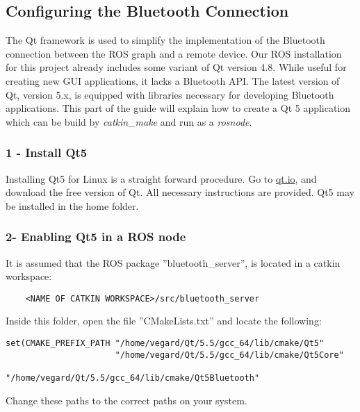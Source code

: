 \subsection{Configuring the Bluetooth Connection}

The Qt framework is used to simplify the implementation of the Bluetooth connection between the \ac{ROS} graph and a remote device. Our \ac{ROS} installation for this project already includes some variant of Qt version 4.8. While useful for creating new \ac{GUI} applications, it lacks a Bluetooth API. The latest version of Qt, version 5.x, is equipped with libraries necessary for developing Bluetooth applications. This part of the guide will explain how to create a Qt 5 application which can be build by \textit{catkin\_make} and run as a \textit{rosnode}.

\subsubsection{1 - Install Qt5}

Installing Qt5 for Linux is a straight forward procedure. Go to \url{qt.io}, and download the free version of Qt. All necessary instructions are provided. Qt5 may be installed in the home folder.

\subsubsection{2- Enabling Qt5 in a ROS node}

It is assumed that the \ac{ROS} package ''bluetooth\_server'', is located in a catkin workspace:
\begin{verbatim}
	<NAME OF CATKIN WORKSPACE>/src/bluetooth_server
\end{verbatim}

Inside this folder, open the file ''CMakeLists.txt'' and locate the following:

\begin{verbatim}
set(CMAKE_PREFIX_PATH "/home/vegard/Qt/5.5/gcc_64/lib/cmake/Qt5"
					  "/home/vegard/Qt/5.5/gcc_64/lib/cmake/Qt5Core"
					  "/home/vegard/Qt/5.5/gcc_64/lib/cmake/Qt5Bluetooth"
\end{verbatim}

Change these paths to the correct paths on your system.



